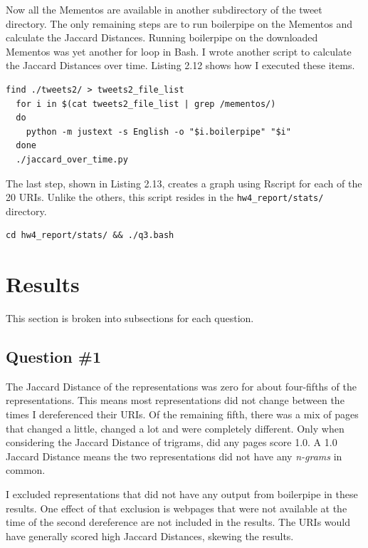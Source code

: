 \documentclass[a4paper,12pt]{article}
\begin{document}
Now all the Mementos are available in another subdirectory of the tweet directory. The only remaining steps
are to run boilerpipe on the Mementos and calculate the Jaccard Distances. Running boilerpipe on the
downloaded Mementos was yet another for loop in Bash. I wrote another script to calculate the Jaccard
Distances over time. Listing 2.12 shows how I executed these items.

\begin{lstlisting}[basicstyle=\ttfamily,caption={Boilerpipe and Jaccard Distance}]
  find ./tweets2/ > tweets2_file_list
  for i in $(cat tweets2_file_list | grep /mementos/)
  do
    python -m justext -s English -o "$i.boilerpipe" "$i"
  done
  ./jaccard_over_time.py
\end{lstlisting}

The last step, shown in Listing 2.13, creates a graph using Rscript for each of the 20 URIs. Unlike the others,
this script resides in the \texttt{hw4\_report/stats/} directory.

\begin{lstlisting}[basicstyle=\ttfamily,caption={Generating R Graphs}]
    cd hw4_report/stats/ && ./q3.bash
\end{lstlisting}

\section{Results}
This section is broken into subsections for each question.

\subsection{Question \#1}
The Jaccard Distance of the representations was zero for about four-fifths of the representations. This means
most representations did not change between the times I dereferenced their URIs. Of the remaining fifth,
there was a mix of pages that changed a little, changed a lot and were completely different. Only
when considering the Jaccard Distance of trigrams, did any pages score 1.0. A 1.0 Jaccard Distance means
the two representations did not have any \emph{n-grams} in common.

I excluded representations that did not have any output from boilerpipe in these results. One effect of that
exclusion is webpages that were not available at the time of the second dereference are not included in the
results. The URIs would have generally scored high Jaccard Distances, skewing the results.
\end{document}
